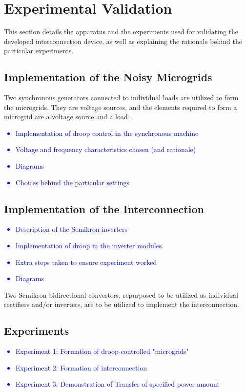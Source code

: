 \chapter{Experimental Validation}

This section details the apparatus and the experiments used for validating the developed interconnection device, as well as explaining the rationale behind the particular experiments.

\section{Implementation of the Noisy Microgrids}

Two synchronous generators connected to individual loads are utilized to form the microgrids. They are voltage sources, and the elements required to form a microgrid are a voltage source and a load \cite{Blaabjerg_Grid_Synchronization}.

\textcolor{blue}{
\begin{itemize}
    \item Implementation of droop control in the synchronous machine
    \item Voltage and frequency characteristics chosen (and rationale)
    \item Diagrams
    \item Choices behind the particular settings
\end{itemize}
}

\section{Implementation of the Interconnection}

\textcolor{blue}{
\begin{itemize}
    \item Description of the Semikron inverters
    \item Implementation of droop in the inverter modules
    \item Extra steps taken to ensure experiment worked 
    \item Diagrams
\end{itemize}
}

Two Semikron bidirectional converters, repurposed to be utilized as individual rectifiers and/or inverters, are to be utilized to implement the interconnection.

\section{Experiments}

\textcolor{blue}{
\begin{itemize}
    \item Experiment 1: Formation of droop-controlled "microgrids"
    \item Experiment 2: Formation of interconnection 
    \item Experiment 3: Demonstration of Transfer of specified power amount
\end{itemize}
}